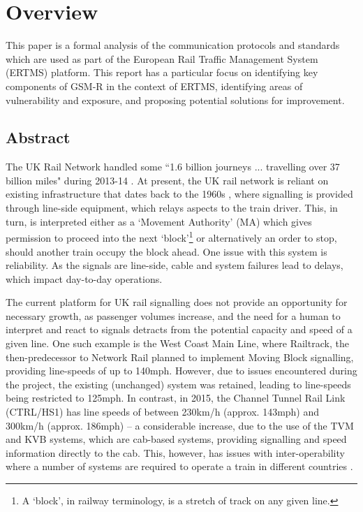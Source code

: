 \section{Overview}
This paper is a formal analysis of the communication protocols and standards which are used as part of the European Rail Traffic Management System (ERTMS) platform. This report has a particular focus on identifying key components of GSM-R in the context of ERTMS, identifying areas of vulnerability and exposure, and proposing potential solutions for improvement.

\subsection{Abstract}
The UK Rail Network handled some ``1.6 billion journeys ... travelling over 37 billion miles" during 2013-14 \citep{RailExecutive14a}. At present, the UK rail network is reliant on existing infrastructure that dates back to the 1960s \citep{NetworkRail12a}, where signalling is provided through line-side equipment, which relays aspects to the train driver. This, in turn, is interpreted either as a `Movement Authority' (MA) which gives permission to proceed into the next `block'\footnote{A `block', in railway terminology, is a stretch of track on any given line.} or alternatively an order to stop, should another train occupy the block ahead. One issue with this system is reliability. As the signals are line-side, cable and system failures lead to delays, which impact day-to-day operations.

The current platform for UK rail signalling does not provide an opportunity for necessary growth, as passenger volumes increase, and the need for a human to interpret and react to signals detracts from the potential capacity and speed of a given line. One such example is the West Coast Main Line, where Railtrack, the then-predecessor to Network Rail planned to implement Moving Block signalling, providing line-speeds of up to 140mph. However, due to issues encountered during the project, the existing (unchanged) system was retained, leading to line-speeds being restricted to 125mph. In contrast, in 2015, the Channel Tunnel Rail Link (CTRL/HS1) has line speeds of between 230km/h (approx. 143mph) and 300km/h (approx. 186mph)\citep{RailTech15} -- a considerable increase, due to the use of the TVM and KVB systems, which are cab-based systems, providing signalling and speed information directly to the cab. This, however, has issues with inter-operability where a number of systems are required to operate a train in different countries \citep{IRJ14a}.

